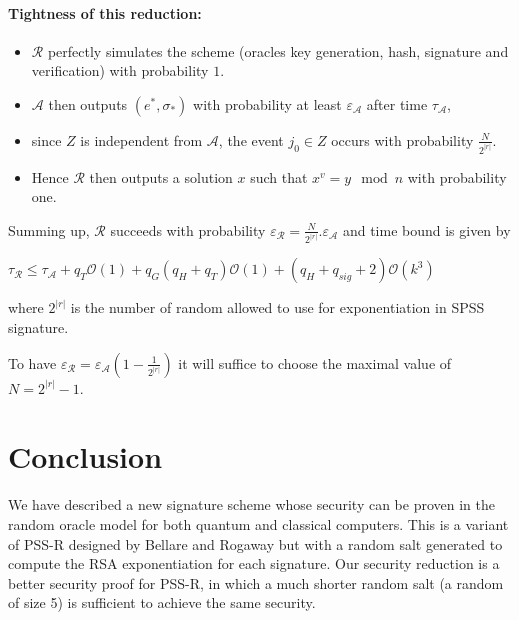 \documentclass[a4paper,11pt]{article}
\begin{document}
\paragraph{Tightness of this reduction:}
\begin{itemize}
 \item  $\mathcal{R}$ perfectly simulates the scheme (oracles key generation,  hash, signature and verification) with probability $1$.
 \item $\mathcal{A}$ then outputs  $(e^{*}, \sigma_{*}) $ with probability at least  $\varepsilon_{\mathcal{A}}$
after time $\tau_{\mathcal{A}}$,
 \item  since $Z$ is independent from $\mathcal{A}$, the event $j_{0} \in Z $ occurs with probability $\frac{N}{2^{|r|}}$.
\item Hence $\mathcal{R}$ then outputs a solution $x$ such that $x^{v} = y \mod n$ with probability one.
 \end{itemize}
Summing up, $\mathcal{R}$ succeeds with probability $\varepsilon_{\mathcal{R}} = \frac{N}{2^{|r|}}.\varepsilon_{\mathcal{A}} $
  and time bound is given by

  \vspace{0.2cm}

   $\tau_{\mathcal{R}}\leq \tau_{\mathcal{A}} + q_{T}\mathcal{O}(1) + q_{G}(q_{H}+q_{T})\mathcal{O}(1)+ (q_{H}+q_{sig}+2)\mathcal{O}(k^{3})$

   \vspace{0.2cm}

 where $2^{|r|}$ is the number of random allowed to use for exponentiation in SPSS signature.

To have $\varepsilon_{\mathcal{R}} = \varepsilon_{\mathcal{A}}(1-\frac{1}{2^{|r|}}) $ it will suffice to choose the maximal value of $N=2^{|r|}-1$.
\section{Conclusion}
We have described a new signature scheme whose security can be proven in the random oracle model for both quantum and classical computers. This is a variant of PSS-R designed by Bellare and Rogaway but with a random salt generated to compute the RSA exponentiation for each signature. Our security reduction is a better security proof for PSS-R, in which a much shorter random salt (a random of size 5) is sufficient to achieve the same security.
\end{document}
